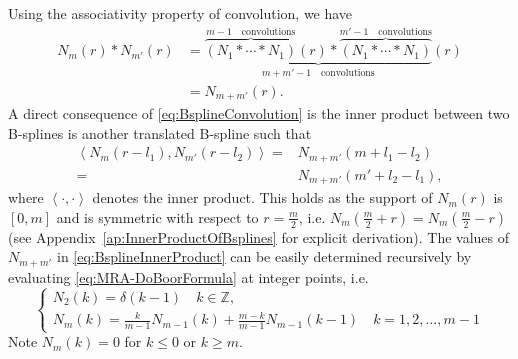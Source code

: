 \documentclass[11pt,draftcls,onecolumn,peerreview]{IEEEtran}
\begin{document}
Using the associativity property of convolution, we have
\setlength{\arraycolsep}{0.0em}
\begin{align}\label{eq:BsplineConvolution}
N_{m}\left( r\right) \ast N_{m'}\left(r\right)&=\underbrace{\overbrace{\left(N_{1} \ast \cdots \ast N_{1}\right)}^{m-1 \quad \text{convolutions}}\left(r\right) \ast \overbrace{\left(N_{1} \ast \cdots \ast N_{1}\right)}^{m'-1\quad \text{convolutions}}}_{m+m'-1 \quad \text{convolutions}}\left(r\right)\nonumber\\
&=N_{m+m'}\left(r\right).
\end{align}
A direct consequence of \eqref{eq:BsplineConvolution} is the inner product between two B-splines is another translated B-spline such that
\begin{align}
 \left\langle N_{m}\left(r-l_{1}\right), N_{m'}\left(r-l_{2}\right)\right\rangle=&N_{m+m'}\left(m+l_{1}-l_{2}\right)\nonumber \\
=&N_{m+m'}\left(m'+l_{2}-l_{1}\right),
\label{eq:BsplineInnerProduct}
\end{align}
where $\left\langle \cdot,\cdot\right\rangle $ denotes the inner product. This holds as the support of $N_m\left(r\right)$ is $\left[ 0,m\right]$ and  is symmetric with respect to $r=\frac{m}{2}$, i.e. $ N_{m}\left(\frac{m}{2}+r\right)=N_{m}\left(\frac{m}{2}-r\right)$ (see Appendix~\ref{ap:InnerProductOfBsplines} for explicit derivation). The values of $N_{m+m'}$ in \eqref{eq:BsplineInnerProduct} can be easily determined recursively by evaluating \eqref{eq:MRA-DoBoorFormula} at integer points, i.e.
 \begin{equation}\label{eq:MRA-recursiveBsplineatintegerpoints}
 \begin{cases}
 N_2(k)=\delta(k-1)\quad k\in \mathbb{Z}, \\
 N_{m}\left(k\right)=\frac{k}{m-1}N_{m-1}\left(k\right)+\frac{m-k}{m-1}N_{m-1}\left(k-1\right) \quad k=1,2,\dots,m-1
  \end{cases}
 \end{equation}
Note $N_{m}\left(k\right)=0$ for $k\le0$ or $k\ge m$. 
\end{document}
